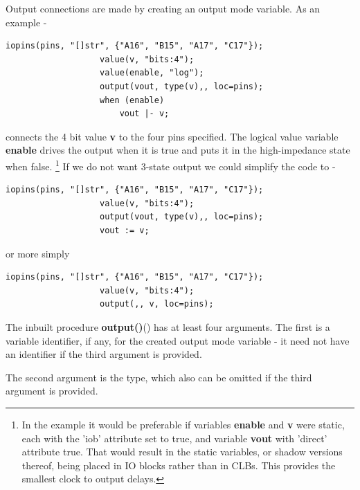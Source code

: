             Output connections are made by creating an output mode variable.
            As an example -
            \begin{lstlisting}[gobble=12, language=threepl]
                   iopins(pins, "[]str", {"A16", "B15", "A17", "C17"});
                   value(v, "bits:4");
                   value(enable, "log");
                   output(vout, type(v),, loc=pins);
                   when (enable)
                       vout |- v;
            \end{lstlisting}
            connects the 4 bit value {\bf v} to the four pins specified.
            The logical value variable {\bf enable} drives the output
            when it is true and puts it in the high-impedance state when false.
            \footnote{In the example it would be preferable if
            variables {\bf enable} and {\bf v} were static, each with the 'iob' attribute set to
            true, and variable {\bf vout} with 'direct' attribute true. That would
            result in the static variables, or shadow versions thereof, being
            placed in IO blocks rather than in CLBs. This provides the smallest 
            clock to output delays.}
            If we do not want 3-state output we could simplify the code to -
            \begin{lstlisting}[gobble=12, language=threepl]
                   iopins(pins, "[]str", {"A16", "B15", "A17", "C17"});
                   value(v, "bits:4");
                   output(vout, type(v),, loc=pins);
                   vout := v;
            \end{lstlisting}
            or more simply
            \begin{lstlisting}[gobble=12, language=threepl]
                   iopins(pins, "[]str", {"A16", "B15", "A17", "C17"});
                   value(v, "bits:4");
                   output(,, v, loc=pins);
            \end{lstlisting}

            The inbuilt procedure {\bf output()}() has at
            least four
            arguments. The first is a variable identifier, if any, for the created
            output mode variable - it need not have an identifier if the third
            argument is provided.
            
            The second argument is the type, which also can be omitted if the third
            argument is provided.

